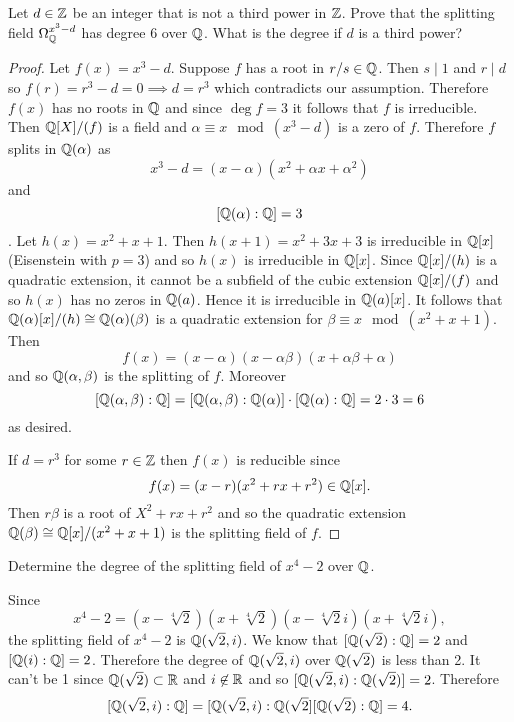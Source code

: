     \begin{ex}{21.36}
        Let $d\in\mathbb{Z}$ be an integer that is not a third power in $\mathbb{Z}$. Prove that the splitting field $\Omega_{\mathbb{Q}}^{x^3-d}$ has degree 6 over $\mathbb{Q}$.
        What is the degree if $d$ is a third power?
    \end{ex}
    \begin{proof}
        Let $f(x)=x^3-d$. Suppose $f$ has a root in $r/s\in\mathbb{Q}$. Then $s\mid 1$ and $r\mid d$ so $f(r)=r^3-d=0\implies d=r^3$ which contradicts our assumption.
        Therefore $f(x)$ has no roots in $\mathbb{Q}$ and since $\deg f=3$ it follows that $f$ is irreducible. Then $\mathbb{Q}[X]/(f)$ is a field and $\alpha\equiv x\mod\left(x^3-d\right)$ is a zero of $f$.
        Therefore $f$ splits in $\mathbb{Q}(\alpha)$ as
        $$x^3-d=(x-\alpha)(x^2+\alpha x+\alpha^2)$$
        and $$[\mathbb{Q}(\alpha):\mathbb{Q}]=3$$. 
        Let $h(x)=x^2+x+1$. Then $h(x+1)=x^2+3x+3$ is irreducible in $\mathbb{Q}[x]$ (Eisenstein with $p=3$) and so $h(x)$ is irreducible in $\mathbb{Q}[x]$.
        Since $\mathbb{Q}[x]/(h)$ is a quadratic extension, it cannot be a subfield of the cubic extension $\mathbb{Q}[x]/(f)$ and so $h(x)$ has no zeros in $\mathbb{Q}(a)$.
        Hence it is irreducible in $\mathbb{Q}(a)[x]$. 
        It follows that  $\mathbb{Q}(\alpha)[x]/(h)\cong\mathbb{Q}(\alpha)(\beta)$ is a quadratic extension for $\beta\equiv x\mod\left(x^2+x+1\right)$.
        Then 
        $$f(x)=(x-\alpha)(x-\alpha\beta)(x+\alpha\beta+\alpha)$$
        and so $\mathbb{Q}(\alpha, \beta)$ is the splitting of $f$.
        Moreover
        $$[\mathbb{Q}(\alpha, \beta):\mathbb{Q}]=[\mathbb{Q}(\alpha,\beta):\mathbb{Q}(\alpha)]\cdot[\mathbb{Q}(\alpha):\mathbb{Q}]=2\cdot 3= 6$$
        as desired.

        If $d=r^3$ for some $r\in\mathbb{Z}$ then $f(x)$ is reducible since
        $$f(x)=(x-r)(x^2+rx+r^2)\in\mathbb{Q}[x].$$
        Then $r\beta$ is a root of $X^2+rx+r^2$ and so the quadratic extension $\mathbb{Q}(\beta)\cong\mathbb{Q}[x]/(x^2+x+1)$ is the splitting field of $f$.
    \end{proof}

    \begin{ex}{21.37}
        Determine the degree of the splitting field of $x^4-2$ over $\mathbb{Q}$.
    \end{ex}
    \begin{sol}
        Since
        $$x^4-2=(x-\sqrt[4]{2})(x+\sqrt[4]{2})(x-\sqrt[4]{2}i)(x+\sqrt[4]{2}i),$$
        the splitting field of $x^4-2$ is $\mathbb{Q}(\sqrt{2}, i)$.
        We know that $[\mathbb{Q}(\sqrt{2}):\mathbb{Q}]=2$ and $[\mathbb{Q}(i):\mathbb{Q}]=2$. Therefore the degree of $\mathbb{Q}(\sqrt{2},i)$ over $\mathbb{Q}(\sqrt{2})$ is less than 2.
        It can't be 1 since $\mathbb{Q}(\sqrt{2})\subset\mathbb{R}$ and $i\not\in\mathbb{R}$ and so $[\mathbb{Q}(\sqrt{2},i):\mathbb{Q}(\sqrt{2})]=2$. Therefore
        $$[\mathbb{Q}(\sqrt{2},i):\mathbb{Q}]=[\mathbb{Q}(\sqrt{2},i):\mathbb{Q}(\sqrt{2}][\mathbb{Q}(\sqrt{2}):\mathbb{Q}]=4.$$ 
    \end{sol}
    
